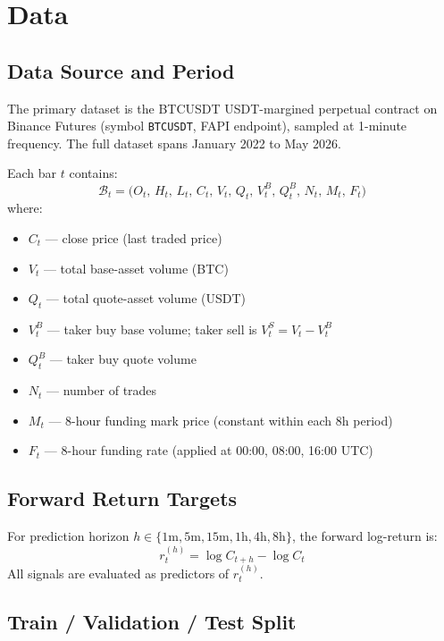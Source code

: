 \documentclass[12pt, a4paper]{article}
\theoremstyle{definition}
\begin{document}
\section{Data}

\subsection{Data Source and Period}

The primary dataset is the BTCUSDT USDT-margined perpetual contract on Binance
Futures (symbol \texttt{BTCUSDT}, FAPI endpoint), sampled at 1-minute
frequency. The full dataset spans January 2022 to May 2026.

Each bar $t$ contains:
\[
  \mathcal{B}_t = \bigl(O_t,\, H_t,\, L_t,\, C_t,\, V_t,\, Q_t,\,
                        V_t^B,\, Q_t^B,\, N_t,\, M_t,\, F_t\bigr)
\]
where:
\begin{itemize}[noitemsep]
  \item $C_t$ — close price (last traded price)
  \item $V_t$ — total base-asset volume (BTC)
  \item $Q_t$ — total quote-asset volume (USDT)
  \item $V_t^B$ — taker buy base volume; taker sell is $V_t^S = V_t - V_t^B$
  \item $Q_t^B$ — taker buy quote volume
  \item $N_t$ — number of trades
  \item $M_t$ — 8-hour funding mark price (constant within each 8h period)
  \item $F_t$ — 8-hour funding rate (applied at 00:00, 08:00, 16:00 UTC)
\end{itemize}

\subsection{Forward Return Targets}

For prediction horizon $h \in \{1\text{m}, 5\text{m}, 15\text{m}, 1\text{h},
4\text{h}, 8\text{h}\}$, the forward log-return is:
\[
  r_t^{(h)} = \log C_{t+h} - \log C_t
\]
All signals are evaluated as predictors of $r_t^{(h)}$.

\subsection{Train / Validation / Test Split}
\end{document}
